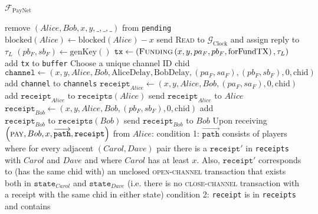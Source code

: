 \begin{functionality}{$\mathcal{F}_{\mathrm{PayNet}}$}
\begin{algorithmic}[1]
        \State remove $\left(Alice, Bob, x, y, \_, \_, \_\right)$ from
        \texttt{pending}
        \State $\mathrm{blocked}\left(Alice\right) \gets
        \mathrm{blocked}\left(Alice\right) - x$
        \State send \textsc{Read} to $\mathcal{G}_{\mathrm{Clock}}$ and assign
        reply to $\tau_L$
        \State $\left(pb_F, sb_F\right) \gets \mathrm{genKey}\left(\right)$
        \State $\mathtt{tx} \gets \left(\textsc{Funding}\left(x, y, pa_F, pb_F,
        \mathrm{forFundTX}\right), \tau_L\right)$
        \State add \texttt{tx} to \texttt{buffer}
        \State Choose a unique channel ID chid
        \State $\mathtt{channel} \gets \left(x, y, Alice, Bob,
        \mathrm{AliceDelay}, \mathrm{BobDelay}, \left(pa_F, sa_F\right),
        \left(pb_F, sb_F\right), 0, \mathrm{chid}\right)$
        \State add \texttt{channel} to \texttt{channels}
        \State $\mathtt{receipt}_{Alice} \gets \left(x, y, Alice, Bob,
        \left(pa_F, sa_F\right), 0, \mathrm{chid}\right)$
        \State add $\mathtt{receipt}_{Alice} \text{ to }
        \mathtt{receipts}\left(Alice\right)$
        \State send $\mathtt{receipt}_{Alice} \text{ to } Alice$
        \State $\mathtt{receipt}_{Bob} \gets \left(x, y, Alice, Bob,
        \left(pb_F, sb_F\right), 0, \mathrm{chid}\right)$
        \State add $\mathtt{receipt}_{Bob} \text{ to }
        \mathtt{receipts}\left(Bob\right)$
        \State send $\mathtt{receipt}_{Bob} \text{ to } Bob$
      \EndIf
    \EndIndent
    \State {}
    \State {}
    \State Upon receiving $\left(\textsc{pay}, Bob, x,
    \overrightarrow{\mathtt{path}}, \mathtt{receipt}\right)$ from $Alice$:
    \Indent
      \State condition 1: $\overrightarrow{\mathtt{path}}$ consists of players
      where for every adjacent $\left(Carol, Dave\right)$ pair there is a
      $\mathtt{receipt}'$ in \texttt{receipts} with $Carol$ and $Dave$ and where
      $Carol$ has at least $x$. Also, $\mathtt{receipt}'$ corresponds to (has
      the same chid with) an unclosed \textsc{open-channel} transaction that
      exists both in $\mathtt{state}_{Carol}$ and $\mathtt{state}_{Dave}$ (i.e.
      there is no \textsc{close-channel} transaction with a receipt with the
      same chid in either state)
      \State condition 2: \texttt{receipt} is in \texttt{receipts} and contains

\end{algorithmic}
\end{functionality}
